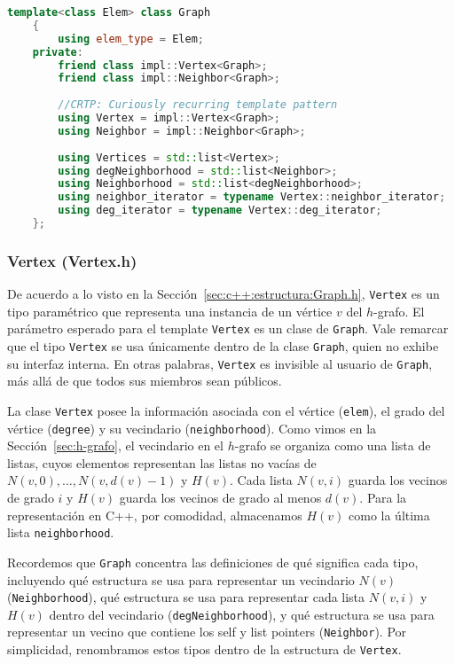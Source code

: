 \documentclass[a4paper,12pt]{article}
\makeatletter
\newcommand{\Code}[1]{\lstinline[basicstyle={\tt}]@#1@}
\makeatother
\begin{document}
\begin{lstlisting}[language={C++},caption={Estructura del tipo Grafo en C++.},gobble=2,float=ht,label={lst:c++:graph}]
    template<class Elem> class Graph
    {
        using elem_type = Elem;
    private:
        friend class impl::Vertex<Graph>;
        friend class impl::Neighbor<Graph>;
    
        //CRTP: Curiously recurring template pattern
        using Vertex = impl::Vertex<Graph>; 
        using Neighbor = impl::Neighbor<Graph>;
        
        using Vertices = std::list<Vertex>;
        using degNeighborhood = std::list<Neighbor>;
        using Neighborhood = std::list<degNeighborhood>;
        using neighbor_iterator = typename Vertex::neighbor_iterator;
        using deg_iterator = typename Vertex::deg_iterator;
    };
\end{lstlisting}

\subsubsection{Vertex (Vertex.h)}
\label{sec:c++:estructura:Vertex.h}

De acuerdo a lo visto en la Sección~\ref{sec:c++:estructura:Graph.h}, \Code{Vertex} es un tipo paramétrico que representa una instancia de un vértice $v$ del $h$-grafo.  El parámetro esperado para el template \Code{Vertex} es un clase de \Code{Graph}.  Vale remarcar que el tipo \Code{Vertex} se usa únicamente dentro de la clase \Code{Graph}, quien no exhibe su interfaz interna.  En otras palabras, \Code{Vertex} es invisible al usuario de \Code{Graph}, más allá de que todos sus miembros sean públicos.

La clase \Code{Vertex} posee la información asociada con el vértice (\Code{elem}), el grado del vértice (\Code{degree}) y su vecindario (\Code{neighborhood}).  Como vimos en la Sección~\ref{sec:h-grafo}, el vecindario en el $h$-grafo se organiza como una lista de listas, cuyos elementos representan las listas no vacías de $N(v, 0), \ldots, N(v, d(v)-1)$ y $H(v)$.  Cada lista $N(v, i)$ guarda los vecinos de grado $i$ y $H(v)$ guarda los vecinos de grado al menos $d(v)$.  Para la representación en C++, por comodidad, almacenamos $H(v)$ como la última lista \Code{neighborhood}.

Recordemos que \Code{Graph} concentra las definiciones de qué significa cada tipo, incluyendo qué estructura se usa para representar un vecindario $N(v)$ (\Code{Neighborhood}), qué estructura se usa para representar cada lista $N(v, i)$ y $H(v)$ dentro del vecindario (\Code{degNeighborhood}), y qué estructura se usa para representar un vecino que contiene los self y list pointers (\Code{Neighbor}).  Por simplicidad, renombramos estos tipos dentro de la estructura de \Code{Vertex}.
\end{document}
